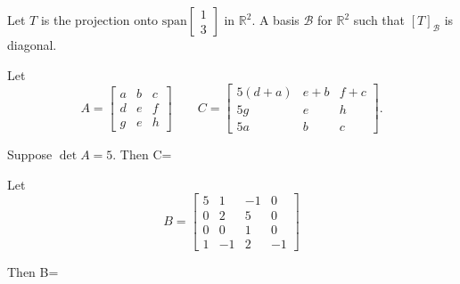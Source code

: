 \documentclass[english,9pt,xcolor=dvipsnames,notheorems]{beamer}
\newcommand{\spn}{\mathrm{span}}
\begin{document}
\begin{frame}
 \vspace{-5 cm}
\PullLS[ch3-VG-geobasis]
 
 \hline
 \vspace{1 cm}
Let $T$ is the projection onto $\spn \begin{bmatrix}
    1\\3
\end{bmatrix}$ in $\mathbb R^2$. A basis $\mathcal B$ for $\mathbb R^2$ such that $[T]_\mathcal B$ is diagonal.


    \vspace{4 cm}

    
\end{frame}


\begin{frame}
 \vspace{-5 cm}
 
 \hline
 \vspace{1 cm}
 
Let \[A=\begin{bmatrix} a&b&c\\d&e&f\\g&e&h\end{bmatrix}\quad \quad C= \begin{bmatrix} 5(d+a)&e+b&f+c \\5g&e&h\\5a&b&c\end{bmatrix}.\]

Suppose $\det A =5$. Then \det C= \fbox{\phantom{777/777} } 
\end{frame}

\begin{frame}
 \vspace{-5 cm}
 
 \hline
 \vspace{1 cm}
Let \[ B=\begin{bmatrix}
			    5&1&-1&0\\0&2&5&0\\0&0&1&0\\1&-1&2&-1
			\end{bmatrix}\]

 Then \det B= \fbox{\phantom{777/777} } 
    
\end{frame}
\end{document}
